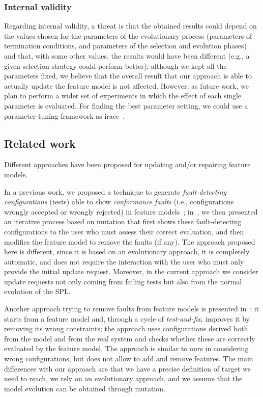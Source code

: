 \begin{tikzborder}{\cite{Gargantini16:validation}}
\begin{tikzborder}{\cite{gargantini_combinatorial_2017}}
\begin{tikzborder}{\cite{gargantini_combinatorial_2017}}
\begin{tikzborder}{\cite{garn2019}}
\begin{tikzborder}{\cite{arcaini2019achieving}}
	\subsubsection{Internal validity}\label{sec:internalValidity}
	\bb Regarding internal validity, a threat is that the obtained results could depend on the values chosen for the parameters of the evolutionary process (parameters of termination conditions, and parameters of the selection and evolution phases) and that, with some other values, the results would have been different (e.g., a given selection strategy could perform better); although we kept all the parameters fixed, we believe that the overall result that our approach is able to actually update the feature model is not affected. However, as future work, we plan to perform a wider set of experiments in which the effect of each single parameter is evaluated. For finding the best parameter setting, we could use a parameter-tuning framework as irace~\cite{irace}.\be
	
	\subsection{Related work}\label{sec:fmrelatedwork1}
	\bb
	Different approaches have been proposed for updating and/or repairing feature models.
	
	In a previous work, we proposed a technique to generate \emph{fault-detecting configurations} (tests) able to show \emph{conformance faults} (i.e., configurations wrongly accepted or wrongly rejected) in feature models~\cite{icst2015}; in~\cite{icst2016}, we then presented an iterative process based on mutation that first shows these fault-detecting configurations to the user who must assess their correct evaluation, and then modifies the feature model to remove the faults (if any). The approach proposed here is different, since it is based on an evolutionary approach, it is completely automatic, and does not require the interaction with the user who must only provide the initial update request. Moreover, in the current approach we consider update requests not only coming from failing tests but also from the normal evolution of the SPL.
	
	Another approach trying to remove faults from feature models is presented in~\cite{henard_towards_2013}: it starts from a feature model and, through a cycle of \emph{test-and-fix}, improves it by removing its wrong constraints; the approach uses configurations derived both from the model and from the real system and checks whether these are correctly evaluated by the feature model. The approach is similar to ours in considering wrong configurations, but does not allow to add and remove features. The main differences with our approach are that we have a precise definition of target we need to reach, we rely on an evolutionary approach, and we assume that the model evolution can be obtained through mutation.
	

\end{tikzborder}
\end{tikzborder}
\end{tikzborder}
\end{tikzborder}
\end{tikzborder}
